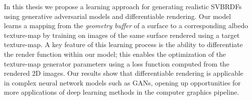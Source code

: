 In this thesis we propose a learning approach for generating realistic SVBRDFs
using generative adversarial models and differentiable rendering. Our model
learns a mapping from the \emph{geometry buffer} of a surface to a corresponding
albedo texture-map by training on images of the same surface rendered using a
target texture-map. A key feature of this learning process is the ability to
differentiate the render function within our model; this enables the optimization
of the texture-map generator parameters using a loss function computed from the
rendered 2D images. Our results show that differentiable rendering is applicable
in complex neural network models such as GANs, opening up opportunities for more
applications of deep learning methods in the computer graphics pipeline.